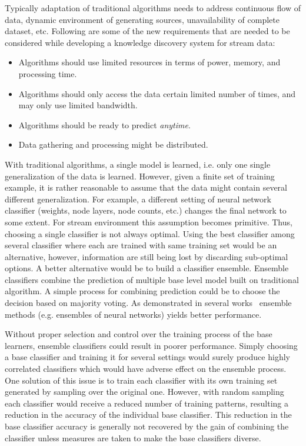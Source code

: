 \documentclass[a4paper, 11pt, oneside]{book}
\begin{document}
Typically adaptation of traditional algorithms needs to address continuous flow of data, dynamic environment of generating sources, unavailability of complete dataset, etc. Following are some of the new requirements that are needed to be considered while developing a knowledge discovery system for stream data:
\begin{itemize}
    \item Algorithms should use limited resources in terms of power, memory, and processing time.
    \item Algorithms should only access the data certain limited number of times, and may only use limited bandwidth.
    \item Algorithms should be ready to predict {\it anytime}. 
    \item Data gathering and processing might be distributed.
\end{itemize}

With traditional algorithms, a single model is learned, i.e. only one single generalization of the data is learned. However, given a finite set of training example, it is rather reasonable to assume that the data might contain several different generalization. For example, a different setting of neural network classifier (weights, node layers, node counts, etc.) changes the final network to some extent. For stream environment this assumption becomes primitive. Thus, choosing a single classifier is not always optimal. Using the best classifier among several classifier where each are trained with same training set would be an alternative, however, information are still being lost by discarding sub-optimal options. A better alternative would be to build a classifier ensemble. Ensemble classifiers combine the prediction of multiple base level model built on traditional algorithm. A simple process for combining prediction could be to choose the decision based on majority voting. As demonstrated in several works~\cite{breiman94:bagging, schapire90:whyens} ensemble methods (e.g. ensembles of neural networks) yields better performance.

Without proper selection and control over the training process of the base learners, ensemble classifiers could result in poorer performance. Simply choosing a base classifier and training it for several settings would surely produce highly correlated classifiers which would have adverse effect on the ensemble process. One solution of this issue is to train each classifier with its own training set generated by sampling over the original one. However, with random sampling each classifier would receive a reduced number of training patterns, resulting a reduction in the accuracy of the individual base classifier. This reduction in the base classifier accuracy is generally not recovered by the gain of combining the classifier unless measures are taken to make the base classifiers diverse.
\end{document}
